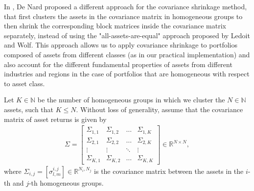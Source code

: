        In \cite{denard}, De Nard proposed a different approach for the covariance shrinkage method, that first clusters the assets in the covariance matrix in homogeneous groups to then shrink the corresponding block matrices inside the covariance matrix separately, instead of using the "all-assets-are-equal" approach proposed by Ledoit and Wolf. This approach allows us to apply covariance shrinkage to portfolios composed of assets from different classes (as in our practical implementation) and also account for the different fundamental properties of assets from different industries and regions in the case of portfolios that are homogeneous with respect to asset class.
        
        \begin{definition}\label{definition:GCVC}
            Let $K \in \mathbb{N}$ be the number of homogeneous groups in which we cluster the $N \in \mathbb{N}$ assets, such that $K \leq N$. Without loss of generality, assume that the covariance matrix of asset returns is given by
            \begin{align*}
                \Sigma = \begin{bmatrix}
                    \Sigma_{1,1} & \Sigma_{1,2} & \dots & \Sigma_{1,K} \\
                    \Sigma_{2,1} & \Sigma_{2,2} & \dots & \Sigma_{2,K} \\
                    \vdots & \vdots & \ddots & \vdots \\
                    \Sigma_{K,1} & \Sigma_{K,2} & \dots & \Sigma_{K,K}
                \end{bmatrix} \in \mathbb{R}^{N \times N},
            \end{align*}
            where $\Sigma_{i,j} = \left[ \sigma_{l,m}^{i,j} \right] \in \mathbb{R}^{N_i, N_j}$ is the covariance matrix between the assets in the $i$-th and $j$-th homogeneous groups.
            

\end{definition}
